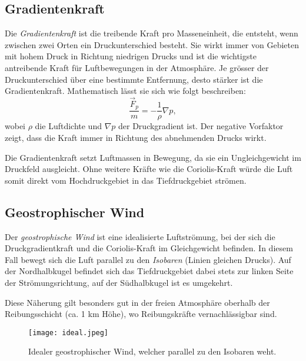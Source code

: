 \subsection{Gradientenkraft
\label{geostrophisch:subsection:gradient}}
Die \emph{Gradientenkraft} ist die treibende Kraft pro Masseneinheit, die entsteht, wenn zwischen zwei Orten ein Druckunterschied besteht. Sie wirkt immer von Gebieten mit hohem Druck in Richtung niedrigen Drucks und ist die wichtigste antreibende Kraft für Luftbewegungen in der Atmosphäre. Je grösser der Druckunterschied über eine bestimmte Entfernung, desto stärker ist die Gradientenkraft.
%
Mathematisch lässt sie sich wie folgt beschreiben:
\begin{equation}
\frac{\vec{F}_p} {m}
= 
-\frac{1}{\rho} \nabla p
\label{geostrophisch:equation4},
\end{equation}
wobei $\rho$ die Luftdichte und $\nabla p$ der Druckgradient ist. 
Der negative Vorfaktor zeigt, dass die Kraft immer in Richtung des abnehmenden Drucks wirkt.

Die Gradientenkraft setzt Luftmassen in Bewegung, da sie ein Ungleichgewicht im Druckfeld ausgleicht. Ohne weitere Kräfte wie die Coriolis-Kraft würde die Luft somit direkt vom Hochdruckgebiet in das Tiefdruckgebiet strömen.

\subsection{Geostrophischer Wind}

Der \emph{geostrophische Wind} ist eine idealisierte Luftströmung, bei der sich die Druckgradientkraft und die Coriolis-Kraft im Gleichgewicht befinden. In diesem Fall bewegt sich die Luft parallel zu den \emph{Isobaren} (Linien gleichen Drucks). Auf der Nordhalbkugel befindet sich das Tiefdruckgebiet dabei stets zur linken Seite der Strömungsrichtung, auf der Südhalbkugel ist es umgekehrt.
%
%

Diese Näherung gilt besonders gut in der freien Atmosphäre oberhalb der Reibungsschicht (ca. 1 km Höhe), wo Reibungskräfte vernachlässigbar sind. 
%

\begin{figure}
    	\centering
    	\texttt{[image: ideal.jpeg]}
  	 \caption{Idealer geostrophischer Wind, welcher parallel zu den Isobaren weht.}
   	\label{bild:ideal}
\end{figure}

